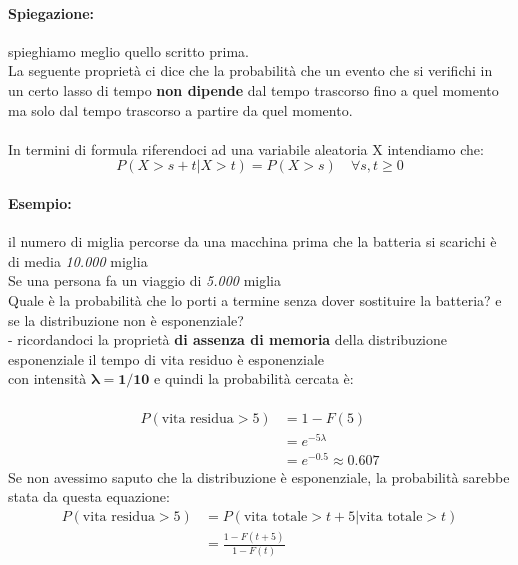 \documentclass[]{article}
\begin{document}
    \paragraph{Spiegazione:} spieghiamo meglio quello scritto prima. \\
    La seguente proprietà ci dice che la probabilità che un evento che si verifichi in un certo lasso di tempo \textbf{non dipende} dal tempo
    trascorso fino a quel momento \\
    ma solo dal tempo trascorso a partire da quel momento. \\ \\
    In termini di formula riferendoci ad una variabile aleatoria X intendiamo che:
    \[ P(X > s + t | X > t) = P(X > s) \quad \forall s,t \geq 0 \]
    \paragraph{Esempio:} il numero di miglia percorse da una macchina prima che la batteria si scarichi è di media \textit{10.000} miglia \\
    Se una persona fa un viaggio di \textit{5.000} miglia \\
    Quale è la probabilità che lo porti a termine senza dover sostituire la batteria? e se la distribuzione non è esponenziale? \\
    - ricordandoci la proprietà \textbf{di assenza di memoria} della distribuzione esponenziale il tempo di vita residuo è esponenziale \\
    con intensità $\boldsymbol{\lambda = 1 / 10}$ e quindi la probabilità cercata è: \\ \\
    \begin{equation*}
        \begin{split}
            P(\text{vita residua} > 5) &= 1 - F(5) \\
            &= e^{-5\lambda} \\
            &= e^{-0.5} \approx 0.607
        \end{split}
    \end{equation*}
    Se non avessimo saputo che la distribuzione è esponenziale, la probabilità sarebbe stata da questa equazione:
    \begin{equation*}
        \begin{split}
            P(\text{vita residua} > 5) &= P(\text{vita totale} > t + 5 | \text{vita totale} > t) \\
            &= \frac{1 - F(t + 5)}{1 - F(t)}
        \end{split}
    \end{equation*}
\end{document}
